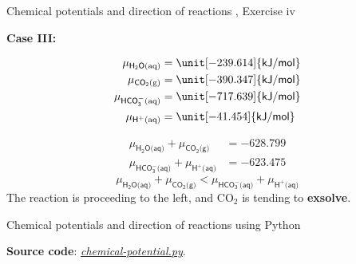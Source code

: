 %
%
\begin{frame}{Chemical potentials and direction of reactions , Exercise \; iv}

\textbf{Case III: }

\lcol
\begin{align*}
\mu_{\mathsf{H_{2}O\text{(aq)}}} & =\unit[-239.614]{\mathsf{kJ/mol}}\\
\mu_{\mathsf{CO_{2}\text{(g)}}} & =\unit[-390.347]{\mathsf{kJ/mol}}\\
\mu_{\mathsf{HCO_{3}^{-}\text{(aq)}}} & =\unit[-717.639]{\mathsf{kJ/mol}}\\
\mu_{\mathsf{H^{+}\text{(aq)}}} & =\unit[-41.454]{\mathsf{kJ/mol}}
\end{align*}
\rcol

\begin{align*}
\mu_{\mathsf{H_{2}O\text{(aq)}}}+\mu_{\mathsf{CO_{2}\text{(g)}}} & =-628.799\\
\mu_{\mathsf{HCO_{3}^{-}\text{(aq)}}}+\mu_{\mathsf{H^{+}\text{(aq)}}} & =-623.475
\end{align*}
\[
\boxed{\mu_{\mathsf{H_{2}O\text{(aq)}}}+\mu_{\mathsf{CO_{2}\text{(g)}}}<\mu_{\mathsf{HCO_{3}^{-}\text{(aq)}}}+\mu_{\mathsf{H^{+}\text{(aq)}}}}
\]
The reaction is proceeding to the left, and CO$_{2}$ is tending to
\textbf{exsolve}.

\ecol
\end{frame}
%
%
\begin{frame}[fragile]{Chemical potentials and direction of reactions using Python}

%
%
\textbf{Source code}: \href{https://polybox.ethz.ch/index.php/s/4kiqklmnBtXs3pG}{\textcolor{indigo(dye)}{\it chemical-potential.py}}.
\end{frame}
